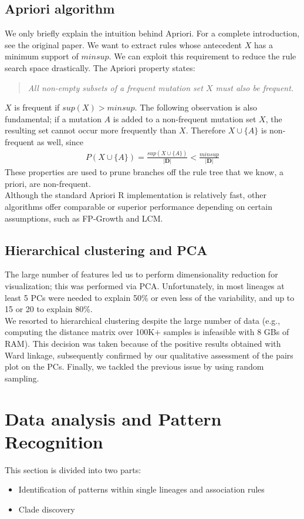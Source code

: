 \documentclass[twoside,twocolumn]{article}
\begin{document}
	\subsection{Apriori algorithm}
	We only briefly explain the intuition behind Apriori. For a complete introduction, see the original paper\cite{apriori}. We want to extract rules whose antecedent $X$ has a minimum support of $minsup$. We can exploit this requirement to reduce the rule search space drastically. The Apriori property states:
	\begin{quote}
		\textit{All non-empty subsets of a frequent mutation set $X$ must also be frequent.} 
	\end{quote}
	$X$ is frequent if $sup(X) > minsup$. The following observation is also fundamental; if a mutation $A$ is added to a non-frequent mutation set $X$, the resulting set cannot occur more frequently than $X$. Therefore $X\cup \{A\}$ is non-frequent as well, since
	\begin{align*}
		P({X\cup \{A\}}) = \frac{sup(X \cup \{A\})}{|\mathbf{D}|}< \frac{minsup}{|\mathbf{D}|}
	\end{align*} 
These properties are used to prune branches off the rule tree that we know, a priori, are non-frequent. 
	\\
	Although the standard Apriori R implementation is relatively fast, other algorithms offer comparable or superior performance depending on certain assumptions, such as FP-Growth\cite{fpgrowth} and LCM\cite{lcm}. 
	\subsection{Hierarchical clustering and PCA}
	The large number of features led us to perform dimensionality reduction for visualization; this was performed via PCA. Unfortunately, in most lineages at least 5 PCs were needed to explain 50\% or even less of the variability, and up to 15 or 20 to explain 80\%. \\
	We resorted to hierarchical clustering despite the large number of data (e.g., computing the distance matrix over 100K+ samples is infeasible with 8 GBs of RAM). This decision was taken because of the positive results obtained with Ward linkage, subsequently confirmed by our qualitative assessment of the pairs plot on the PCs. Finally, we tackled the previous issue by using random sampling.
	\section{Data analysis and Pattern Recognition}
	This section is divided into two parts:
	\begin{itemize}
		\item Identification of patterns within single lineages and association rules
		\item Clade discovery
	\end{itemize}
\end{document}
